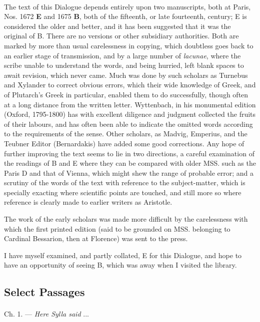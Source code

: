 \documentclass[a4paper, 11pt, oneside, polutonikogreek, english]{article}
\begin{document}
\paragraph{}
The text of this Dialogue depends entirely upon two manuscripts, both at Paris, Nos. 1672 \textbf{E} and 1675 \textbf{B}, both of the fifteenth, or late fourteenth, century; E is considered the older and better, and it has been suggested that it was the original of B. There are no versions or other subsidiary authorities. Both are marked by more than usual carelessness in copying, which doubtless goes back to an earlier stage of transmission, and by a large number of \emph{lacunae}, where the scribe unable to understand the words, and being hurried, left blank spaces to await revision, which never came. Much was done by such scholars as Turnebus and Xylander to correct obvious errors, which their wide knowledge of Greek, and of Plutarch's Greek in particular, enabled them to do successfully, though often at a long distance from the written letter. Wyttenbach, in his monumental edition (Oxford, 1795-1800) has with excellent diligence and judgment collected the fruits of their labours, and has often been able to indicate the omitted words according to the requirements of the sense. Other scholars, as Madvig, Emperius, and the Teubner Editor (Bernardakis) have added some good corrections. Any hope of further improving the text seems to lie in two directions, a careful examination of the readings of B and E where they can be compared with older MSS. such as the Paris D and that of Vienna, which might shew the range of probable error; and a scrutiny of the words of the text with reference to the subject-matter, which is specially exacting where scientific points are touched, and still more so where reference is clearly made to earlier writers as Aristotle.

The work of the early scholars was made more difficult by the carelessness with which the first printed edition (said to be grounded on MSS. belonging to Cardinal Bessarion, then at Florence) was sent to the press.

I have myself examined, and partly collated, E for this Dialogue, and hope to have an opportunity of seeing B, which was away when I visited the library.

\subsection{Select Passages}
\paragraph{}
Ch. 1. --- \emph{Here Sylla said} ... 
\end{document}
